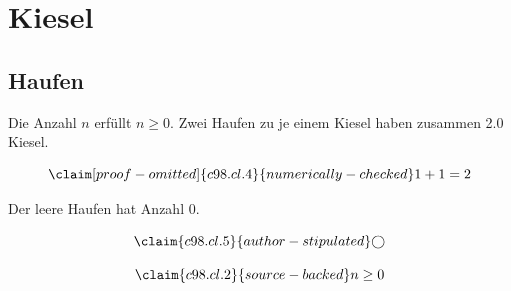 \chapter{Kiesel}\label{c98}
\section{Haufen}\label{c98.s1}

\begin{theorem}[Anzahl]\label{c98.thm.count}
  Die Anzahl $n$ erfüllt $n \geq 0$.
  Zwei Haufen zu je einem Kiesel haben zusammen
  \num[c98.cl.4]{2.0}{} Kiesel.
\end{theorem}

\begin{equation}\label{c98.eq.sum}\claim[proof-omitted]{c98.cl.4}{numerically-checked}
  1 + 1 = 2
\end{equation}

\begin{lemma}[Leer]\label{c98.lem.empty}
  Der leere Haufen hat Anzahl $0$.
\end{lemma}

\begin{equation}\label{c98.eq.circle}\claim{c98.cl.5}{author-stipulated}
  \bigcirc
\end{equation}

\begin{vertiefung}[id=c98.v1, titel={T}, wozu={W}, voraussetzung={V}, zurueck={Z}]
  \begin{equation}\label{c98.eq.page}\claim{c98.cl.2}{source-backed}
    n \geq 0
  \end{equation}
\end{vertiefung}
